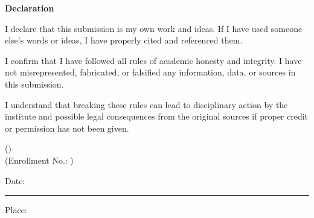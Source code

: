 \thispagestyle{empty}
\vspace*{1.2cm}
\begin{center}
{\fontsize{22}{28}\selectfont\bfseries Declaration\par}
\end{center}
\vspace{1.4cm}
{\setlength{\parskip}{10pt}
\noindent I declare that this submission is my own work and ideas. If I have used someone else's words or ideas, I have properly cited and referenced them.

\noindent I confirm that I have followed all rules of academic honesty and integrity. I have not misrepresented, fabricated, or falsified any information, data, or sources in this submission.

\noindent I understand that breaking these rules can lead to disciplinary action by the institute and possible legal consequences from the original sources if proper credit or permission has not been given.\par}

\vspace{2.0cm}
{
\begin{flushright}
(\StudentName)\\[0.5cm]
(Enrollment No.: \EnrollmentNo)
\end{flushright}}

\vfill
{
\noindent Date: \rule{4cm}{0.4pt}\par
\vspace{0.5cm}
\noindent Place: \PlaceName\par}
\vspace{2.0cm}
\clearpage
